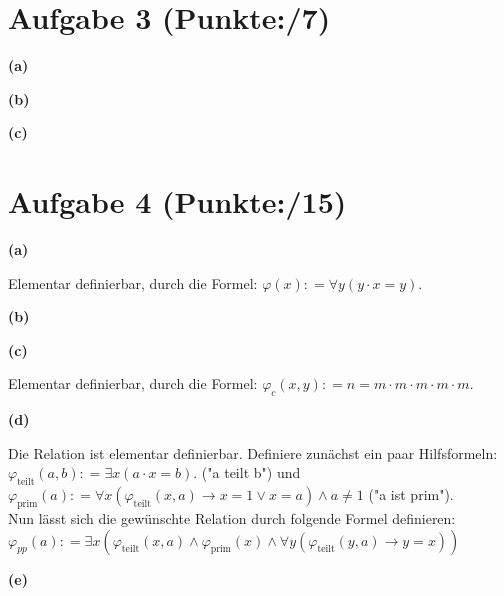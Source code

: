 \documentclass[11pt, a4paper]{article}
\newcommand{\pp}{7}
\newcommand{\ppp}{15}
\newcommand{\defgr}{\mathrel{\mathop:\!\!=}}
\begin{document}
\section*{Aufgabe 3 (Punkte:\qquad/\pp)}
\textbf{(a)}
\begin{adjustwidth}{20pt}{20pt}

\end{adjustwidth}
\textbf{(b)}
\begin{adjustwidth}{20pt}{20pt}

\end{adjustwidth}
\textbf{(c)}
\begin{adjustwidth}{20pt}{20pt}

\end{adjustwidth}

\section*{Aufgabe 4 (Punkte:\qquad/\ppp)}
\textbf{(a)}
\begin{adjustwidth}{20pt}{20pt}
	Elementar definierbar, durch die Formel: $\varphi(x) \defgr \forall y(y \cdot x = y)$.
\end{adjustwidth}
\textbf{(b)}
\begin{adjustwidth}{20pt}{20pt}

\end{adjustwidth}
\textbf{(c)}
\begin{adjustwidth}{20pt}{20pt}
	Elementar definierbar, durch die Formel: $\varphi_c(x,y) \defgr n = m \cdot m \cdot m \cdot m \cdot m$.
\end{adjustwidth}
\textbf{(d)}
\begin{adjustwidth}{20pt}{20pt}
	Die Relation ist elementar definierbar. Definiere zunächst ein paar Hilfsformeln:\\
	$\varphi_{\text{teilt}}(a,b) \defgr \exists x(a \cdot x = b)$. ("a teilt b") und\\
	$\varphi_{\text{prim}}(a) \defgr \forall x(\varphi_{\text{teilt}}(x,a) \rightarrow x=1 \vee x=a) \wedge a\neq 1$ ("a ist prim").\\
	Nun lässt sich die gewünschte Relation durch folgende Formel definieren:\\
	$\varphi_{pp}(a) \defgr \exists x(\varphi_{\text{teilt}}(x,a) \wedge \varphi_{\text{prim}}(x) \wedge \forall y(\varphi_{\text{teilt}}(y,a) \rightarrow y=x))$
\end{adjustwidth}
\textbf{(e)}
\end{document}

